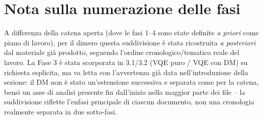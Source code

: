 \documentclass[11pt,a4paper]{article}
\begin{document}
\section{Nota sulla numerazione delle fasi}

A differenza della catena aperta (dove le fasi 1--4 sono state definite
\emph{a priori} come piano di lavoro), per il dimero questa
suddivisione è stata ricostruita \emph{a posteriori} dal materiale già
prodotto, seguendo l'ordine cronologico/tematico reale del lavoro. La
Fase 3 è stata scorporata in 3.1/3.2 (VQE puro / VQE con DM) su
richiesta esplicita, ma va letta con l'avvertenza già data
nell'introduzione della sezione: il DM non è stato un'estensione
successiva e separata come per la catena, bensì un asse di analisi
presente fin dall'inizio nella maggior parte dei file -- la
suddivisione riflette l'enfasi principale di ciascun documento, non una
cronologia realmente separata in due sotto-fasi.
\end{document}
